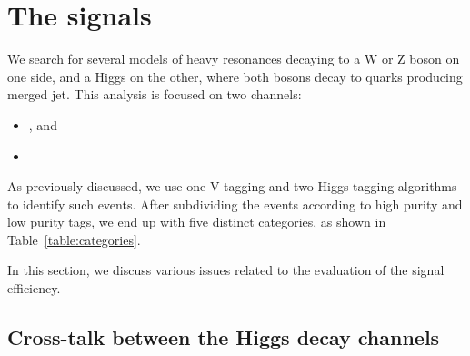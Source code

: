 \section{The signals}
\label{sec:signal}

We search for several models of heavy resonances decaying to
a W or Z boson on one side, and a Higgs on the other, where both bosons 
decay to quarks producing merged jet.  This analysis is focused on two
channels:
\begin{itemize}
\item \HbbVqq, and
\item \HwwVqq
\end{itemize}
As previously discussed, we use one V-tagging and two Higgs tagging algorithms
to identify such events.  After subdividing the events according to 
high purity and low purity tags, we end up with five distinct categories,
as shown in Table~\ref{table:categories}.

In this section, we discuss various issues related to the evaluation
of the signal efficiency.












\subsection{Cross-talk between the Higgs decay channels}
\label{sec:cross-talk}

